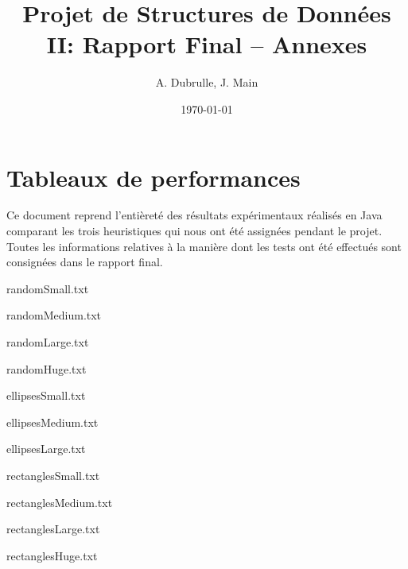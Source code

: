 \documentclass[a4paper, 12pt]{article}
\title{Projet de Structures de Données II: Rapport Final -- Annexes}
\author{A. Dubrulle, J. Main}
\date{\today}
\theoremstyle{definition} \newtheorem{df}{D\'{e}finition}[section]
\theoremstyle{definition} \newtheorem{ex}[df]{Exemple}
\theoremstyle{definition} \newtheorem{thm}[df]{Th\'{e}or\`{e}me}
\theoremstyle{definition} \newtheorem{cor}[df]{Corollaire}
\theoremstyle{definition} \newtheorem{lem}[df]{Lemme}
\theoremstyle{definition} \newtheorem{obs}[df]{Observation}
\theoremstyle{definition} \newtheorem{prop}[df]{Proposition}
\theoremstyle{definition} \newtheorem{rem}[df]{Remarque}
\begin{document}
\maketitle
\section*{Tableaux de performances}
Ce document reprend l'entièreté des résultats expérimentaux
réalisés en Java comparant les trois heuristiques qui nous ont été assignées
pendant le projet. Toutes les informations relatives à la manière
dont les tests ont été effectués sont consignées dans le rapport final.

\begin{table}[h]
\caption{randomSmall.txt}

\end{table}

\begin{table}[h]
\caption{randomMedium.txt}

\end{table}

\begin{table}[h]
\caption{randomLarge.txt}

\end{table}

\begin{table}[h]
\caption{randomHuge.txt}

\end{table}


\begin{table}[h]
\caption{ellipsesSmall.txt}

\end{table}

\begin{table}[h]
\caption{ellipsesMedium.txt}

\end{table}

\begin{table}[h]
\caption{ellipsesLarge.txt}

\end{table}

\begin{table}[h]
\caption{rectanglesSmall.txt}

\end{table}

\begin{table}[h]
\caption{rectanglesMedium.txt}

\end{table}

\begin{table}[h]
\caption{rectanglesLarge.txt}

\end{table}

\begin{table}[h]
\caption{rectanglesHuge.txt}

\end{table}
\end{document}
